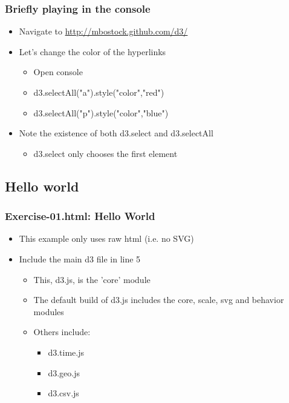 \documentclass{beamer}
\begin{document}
\begin{frame}
    \frametitle{Briefly playing in the console}
    \begin{itemize}
    \item Navigate to \href{http://mbostock.github.com/d3/}{http://mbostock.github.com/d3/}
    \item Let's change the color of the hyperlinks
        \begin{itemize}
        \item Open console
        \item d3.selectAll("a").style("color","red")
        \item d3.selectAll("p").style("color","blue")
        \end{itemize}
    \item Note the existence of both d3.select and d3.selectAll
        \begin{itemize}
        \item d3.select only chooses the first element
        \end{itemize}
    \end{itemize}
\end{frame}



\subsection{Hello world}

\begin{frame}
    \frametitle{Exercise-01.html: Hello World}
    \begin{itemize}
    \item This example only uses raw html (i.e. no SVG)
    \item Include the main d3 file in line 5
        \begin{itemize}
        \item This, d3.js, is the 'core' module
        \item The default build of d3.js includes the core, scale, svg and behavior modules
        \item Others include:
            \begin{itemize}
            \item d3.time.js
            \item d3.geo.js
            \item d3.csv.js
            \end{itemize}
        \end{itemize}
    \end{itemize}
\end{frame}
\end{document}
